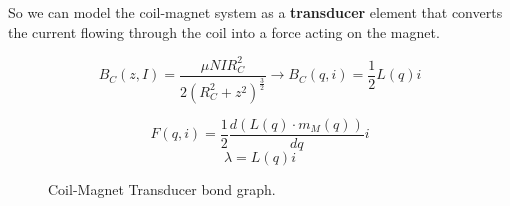 \pagebreak

\begin{samepage}
    So we can model the coil-magnet system as a \textbf{transducer} element that converts the current flowing through the coil into a force acting on the magnet.
    \nopagebreak

    \begin{equation*}
        B_C(z, I) = \frac{\mu N I R_C^2}{2(R_C^2+z^2)^\frac{3}{2}} \rightarrow B_C(q, i) = \frac{1}{2} L(q) i
    \end{equation*}
    \nopagebreak

    \begin{figure}[H]
        \centering
        \resizebox{.7\linewidth}{!}{
            
        }
        \caption{Coil-Magnet Transducer bond graph.}    
        \label{fig: Coil-Magnet_Transducer}
        
        \begin{equation*}
            F(q, i) = \frac{1}{2} \frac{d \left(L(q) \cdot m_M(q) \right)}{dq} i
        \end{equation*}
        \begin{equation*}
            \lambda = L(q) i
        \end{equation*}
    \end{figure}
\end{samepage}

